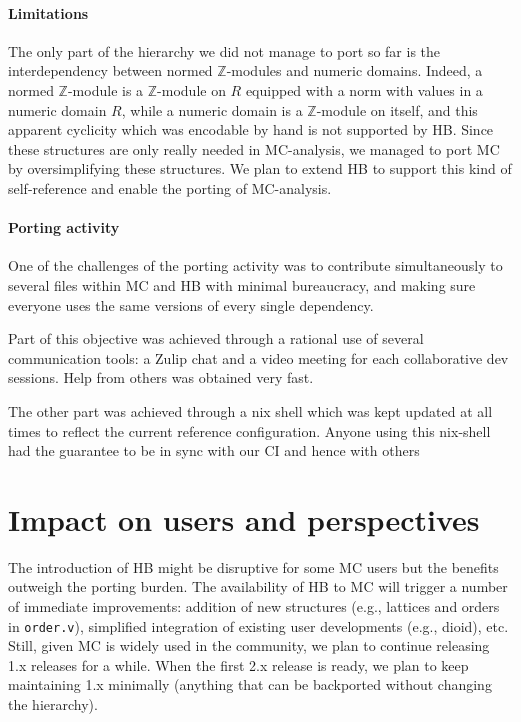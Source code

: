 \documentclass{easychair}
\def\MC{{\sf MC}}
\def\HB{{\sf HB}}
\begin{document}
\paragraph{Limitations}

The only part of the hierarchy we did not manage to port so far is the
interdependency between normed $\mathbb{Z}$-modules and numeric domains.
Indeed, a normed $\mathbb{Z}$-module is a $\mathbb{Z}$-module on $R$
equipped with a norm with values in a numeric domain $R$,
while a numeric domain is a $\mathbb{Z}$-module on itself, and this apparent
cyclicity which was encodable by hand is not supported by \HB{}.
Since these structures are only really needed in \MC{}-analysis,
we managed to port \MC{} by oversimplifying these structures.
We plan to extend \HB{} to support this kind of self-reference
and enable the porting of \MC{}-analysis.

\paragraph{Porting activity}

One of the challenges of the porting activity was to contribute simultaneously
to several files within \MC{} and \HB{} with minimal bureaucracy, and making sure
everyone uses the same versions of every single dependency.

Part of this objective was achieved through a rational use of several
communication tools: a Zulip chat and a video meeting for each
collaborative dev sessions. Help from others was obtained very fast.

The other part was achieved through a nix shell which was kept updated
at all times to reflect the current reference configuration.
Anyone using this nix-shell had the guarantee to be in sync with our CI
and hence with others

\section{Impact on users and perspectives}

The introduction of \HB{} might be disruptive for some \MC{} users
but the benefits outweigh the porting burden.
%
The availability of \HB{} to \MC{} will trigger a number of immediate
improvements: addition of new structures (e.g., lattices and orders in
\verb!order.v!), simplified integration of existing user developments
(e.g., dioid), etc.
%
Still, given \MC{} is widely used in the community, we plan to continue
releasing 1.x releases for a while. When the first 2.x release is ready,
we plan to keep maintaining 1.x minimally (anything that can be backported
without changing the hierarchy).

\label{sect:bib}

%
%
%


\end{document}
